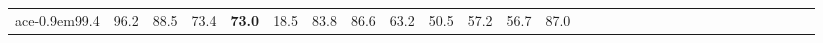 \documentclass{article}
\begin{document}
\begin{table*}[]
\begin{tabular}{cc|cccccccccccccccccccccccccccc}
ace{-0.9em}99.4\hspace{-0.4em} & \hspace{-0.9em}96.2\hspace{-0.4em} & \hspace{-0.9em}88.5\hspace{-0.4em} & \hspace{-0.9em}73.4\hspace{-0.4em} & \hspace{-0.9em}\textbf{73.0}\hspace{-0.4em} & \hspace{-0.9em}18.5\hspace{-0.4em} & \hspace{-0.9em}83.8\hspace{-0.4em} & \hspace{-0.9em}86.6\hspace{-0.4em} & \hspace{-0.9em}63.2\hspace{-0.4em} & \hspace{-0.9em}50.5\hspace{-0.4em} & \hspace{-0.9em}57.2\hspace{-0.4em} & \hspace{-0.9em}56.7\hspace{-0.4em} & \hspace{-0.9em}87.0\hspace{-0.4em} 
        \\

\end{tabular}
\end{table*}
\end{document}

